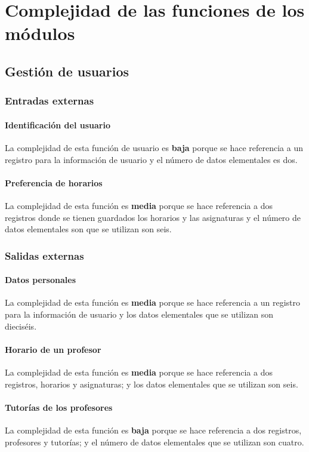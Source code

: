 \documentclass[11pt,a4paper,spanish,twoside]{book}
\begin{document}
\chapter{Complejidad de las funciones de los  módulos} \label{cap:com}
\section{Gestión de usuarios}
\subsection{Entradas externas}
\subsubsection{Identificación del usuario}
La complejidad de esta función de usuario es \textbf{baja} porque se hace
referencia a un registro para la información de usuario y el número de datos
elementales es dos. 

\subsubsection{Preferencia de horarios} 
La complejidad de esta función es \textbf{media} porque se hace
referencia a dos registros donde se tienen guardados los horarios y las
asignaturas y el número de datos elementales son que se utilizan son seis. 

\subsection{Salidas externas}
\subsubsection{Datos personales}
La complejidad de esta función es \textbf{media} porque se hace referencia a
un registro para la información de usuario y los datos elementales que se
utilizan son dieciséis.

\subsubsection{Horario de un profesor}
La complejidad de esta función es \textbf{media} porque se hace referencia a
dos registros, horarios y asignaturas; y los datos elementales que
se utilizan son seis.

\subsubsection{Tutorías de los profesores} 
La complejidad de esta función es \textbf{baja} porque se hace referencia a
dos registros, profesores y tutorías; y el número de datos elementales que se
utilizan son cuatro. 
\end{document}
